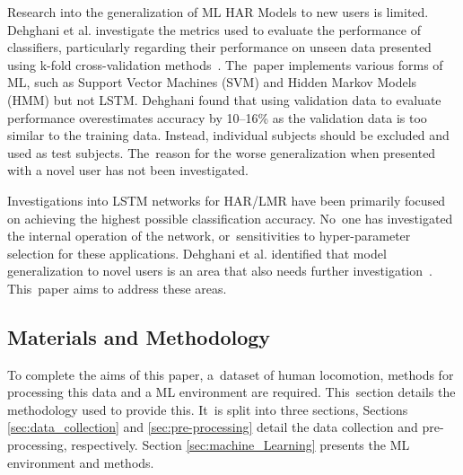Research into the generalization of ML HAR Models to new users is limited. Dehghani et al. investigate the metrics used to evaluate the performance of classifiers, particularly regarding their performance on unseen data presented using k-fold cross-validation methods~\cite{Dehghani2019}. The~paper implements various forms of ML, such as Support Vector Machines (SVM) and Hidden Markov Models (HMM) but not LSTM. Dehghani found that using validation data to evaluate performance overestimates accuracy by 10--16\% as the validation data is too similar to the training data. Instead, individual subjects should be excluded and used as test subjects. The~reason for the worse generalization when presented with a novel user has not been investigated.

Investigations into LSTM networks for HAR/LMR have been primarily focused on achieving the highest possible classification accuracy. No~one has investigated the internal operation of the network, or~sensitivities to hyper-parameter selection for these applications. Dehghani et al. identified that model generalization to novel users is an area that also needs further investigation~\cite{Dehghani2019}. This~paper aims to address these areas.

\subsection{Materials and Methodology}
\label{sec:materials_and_methdology}
To complete the aims of this paper, a~dataset of human locomotion, methods for processing this data and a ML environment are required. This~section details the methodology used to provide this. It~is split into three sections, Sections \ref{sec:data_collection} and \ref{sec:pre-processing} detail the data collection and pre-processing, respectively. Section \ref{sec:machine_Learning} presents the ML environment and methods.

